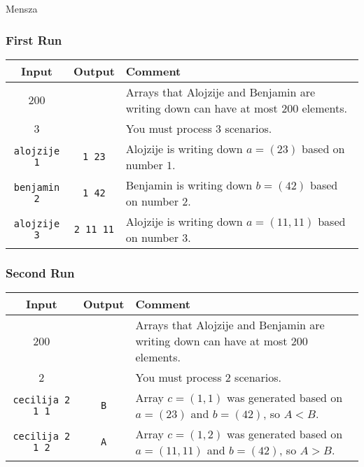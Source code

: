 \begin{statement}[
  problempoints=100,
  timelimit=5 seconds,
  memorylimit=512 MiB,
]{Mensza}
\subsubsection*{First Run}
{\renewcommand{\arraystretch}{1.4}
  \setlength{\tabcolsep}{6pt}
  \begin{tabular}{ccl}
    Input & Output & Comment \\ \midrule
     200 & & Arrays that Alojzije and Benjamin are writing down can have at most $200$ elements. \\
     3   & & You must process $3$ scenarios. \\
    \texttt{\frenchspacing alojzije 1} & \texttt{1 23} & Alojzije is writing down $a = (23)$ based on number $1$. \\
    \texttt{\frenchspacing benjamin 2} & \texttt{1 42} & Benjamin is writing down $b = (42)$ based on number $2$. \\
    \texttt{\frenchspacing alojzije 3} & \texttt{2 11 11} & Alojzije is writing down $a = (11, 11)$ based on number $3$. \\
\end{tabular}}

\subsubsection*{Second Run}
{\renewcommand{\arraystretch}{1.4}
  \setlength{\tabcolsep}{6pt}
  \begin{tabular}{ccl}
    Input & Output & Comment \\ \midrule
     200 & & Arrays that Alojzije and Benjamin are writing down can have at most $200$ elements. \\
     2   & & You must process $2$ scenarios. \\
    \texttt{\frenchspacing cecilija 2 1 1} & \texttt{B} & Array $c = (1, 1)$ was generated based on $a = (23)$ and $b = (42)$, so $A < B$.\\
    \texttt{\frenchspacing cecilija 2 1 2} & \texttt{A} & Array $c = (1, 2)$ was generated based on $a = (11, 11)$ and $b = (42)$, so $A > B$.\\
\end{tabular}}


\end{statement}

